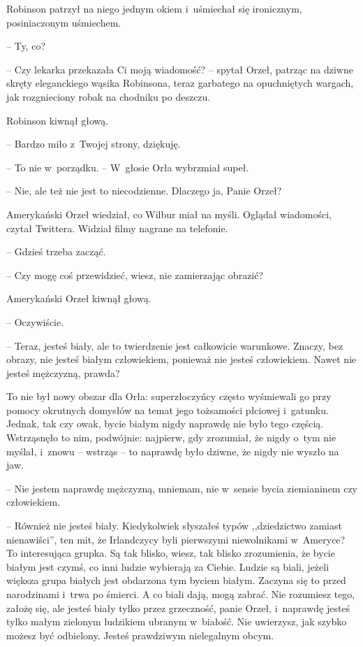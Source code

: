 \documentclass[oneside,polish,11pt,sfheadings]{mwbk}
\begin{document}
Robinson patrzył na niego jednym okiem i~uśmiechał się ironicznym,
posiniaczonym uśmiechem. 

-- Ty, co?

-- Czy lekarka przekazała Ci moją wiadomość? -- spytał Orzeł, patrząc na
dziwne skręty eleganckiego wąsika Robinsona, teraz garbatego na
opuchniętych wargach, jak rozgnieciony robak na chodniku po deszczu.

Robinson kiwnął głową. 

-- Bardzo miło z~Twojej strony, dziękuję.

-- To nie w~porządku. -- W~głosie Orła wybrzmiał supeł.

-- Nie, ale też nie jest to niecodzienne. Dlaczego ja, Panie Orzeł?

Amerykański Orzeł wiedział, co Wilbur miał na myśli. Oglądał wiadomości,
czytał Twittera. Widział filmy nagrane na telefonie. 

-- Gdzieś trzeba
zacząć.

-- Czy mogę coś przewidzieć, wiesz, nie zamierzając obrazić?

Amerykański Orzeł kiwnął głową. 

-- Oczywiście.

-- Teraz, jesteś biały, ale to twierdzenie jest całkowicie warunkowe.
Znaczy, bez obrazy, nie jesteś białym człowiekiem, ponieważ nie jesteś
człowiekiem. Nawet nie jesteś mężczyzną, prawda?

To nie był nowy obszar dla Orła: superzłoczyńcy często wyśmiewali go
przy pomocy okrutnych domysłów na temat jego tożsamości płciowej i~gatunku. Jednak, tak czy owak, bycie białym nigdy naprawdę nie było tego
częścią. Wstrząsnęło to nim, podwójnie: najpierw, gdy zrozumiał, że
nigdy o~tym nie myślał, i~znowu -- wstrząs -- to naprawdę było dziwne, że
nigdy nie wyszło na jaw.

-- Nie jestem naprawdę mężczyzną, mniemam, nie w~sensie bycia ziemianinem
czy człowiekiem.

-- Również nie jesteś biały. Kiedykolwiek słyszałeś typów ,,dziedzictwo
zamiast nienawiści'', ten mit, że Irlandczycy byli pierwszymi
niewolnikami w~Ameryce? To interesująca grupka. Są tak blisko,
wiesz, tak blisko zrozumienia, że bycie białym jest czymś, co inni
ludzie wybierają za Ciebie. Ludzie są biali, jeżeli większa grupa
białych jest obdarzona tym byciem białym. Zaczyna się to przed
narodzinami i~trwa po śmierci. A co biali dają, mogą zabrać. Nie
rozumiesz tego, założę się, ale jesteś biały tylko przez grzeczność,
panie Orzeł, i~naprawdę jesteś tylko małym zielonym ludzikiem ubranym w~białość. Nie uwierzysz, jak szybko możesz być odbielony. Jesteś
prawdziwym nielegalnym obcym.
\end{document}
